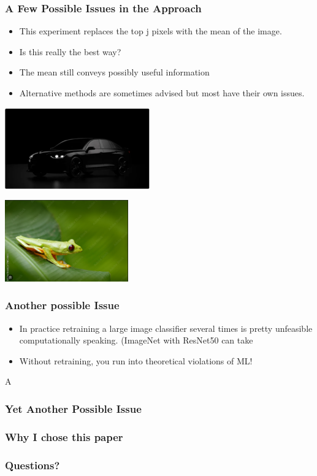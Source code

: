 \documentclass{beamer}
\theoremstyle{mystyle}
\begin{document}
\begin{frame}
    \frametitle{A Few Possible Issues in the Approach}
    \begin{itemize}
        \item This experiment replaces the top j pixels with the mean of the image.
        \item Is this really the best way?
        \item The mean still conveys possibly useful information
        \item Alternative methods are sometimes advised but most have their own issues.
    \end{itemize}
    \begin{minipage}{0.48\textwidth}
        \centering
        \includegraphics[width=\textwidth, height=3.5cm]{black_car.png}
    \end{minipage}
    \hfill
    \begin{minipage}{0.48\textwidth}
        \centering
        \includegraphics[width=\textwidth, height=3.5cm]{green_frog.png}
    \end{minipage}
\end{frame}
\begin{frame}
	\frametitle{Another possible Issue}
	\begin{itemize}
	\item In practice retraining a large image classifier several times is pretty unfeasible computationally speaking.  (ImageNet with ResNet50 can take 
	\item Without retraining, you run into theoretical violations of ML!
	\end{itemize}
\end{frame}A
\begin{frame}
	\frametitle{Yet Another Possible Issue}

\end{frame}
\begin{frame}
	\frametitle{Why I chose this paper}
\end{frame}
\begin{frame}
	\frametitle{Questions?}
\end{frame}
\end{document}
